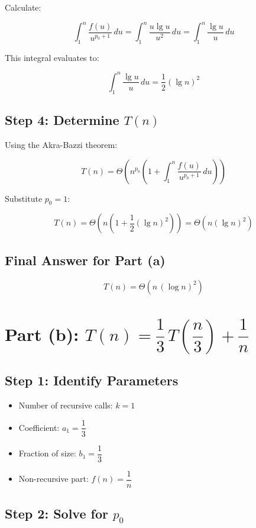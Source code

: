 \documentclass[10pt,letter,notitlepage]{article}
\begin{document}
\begin{Answer}
Calculate:

\[
\int_{1}^{n} \dfrac{f(u)}{u^{p_0 + 1}}\, du = \int_{1}^{n} \dfrac{u \lg u}{u^{2}}\, du = \int_{1}^{n} \dfrac{\lg u}{u}\, du
\]

This integral evaluates to:

\[
\int_{1}^{n} \dfrac{\lg u}{u}\, du = \dfrac{1}{2} (\lg n)^2
\]

\subsection*{Step 4: Determine \( T(n) \)}

Using the Akra-Bazzi theorem:

\[
T(n) = \Theta\left( n^{p_0} \left( 1 + \int_{1}^{n} \dfrac{f(u)}{u^{p_0 + 1}}\, du \right) \right)
\]

Substitute \( p_0 = 1 \):

\[
T(n) = \Theta\left( n \left( 1 + \dfrac{1}{2} (\lg n)^2 \right) \right) = \Theta\left( n (\lg n)^2 \right)
\]

\subsection*{Final Answer for Part (a)}

\[
T(n) = \Theta\left( n\, (\log n)^2 \right)
\]

\bigskip

\section*{Part (b): \( T(n) = \dfrac{1}{3}\, T\left( \dfrac{n}{3} \right) + \dfrac{1}{n} \)}

\subsection*{Step 1: Identify Parameters}

\begin{itemize}
    \item Number of recursive calls: \( k = 1 \)
    \item Coefficient: \( a_1 = \dfrac{1}{3} \)
    \item Fraction of size: \( b_1 = \dfrac{1}{3} \)
    \item Non-recursive part: \( f(n) = \dfrac{1}{n} \)
\end{itemize}

\subsection*{Step 2: Solve for \( p_0 \)}


\end{Answer}
\end{document}
